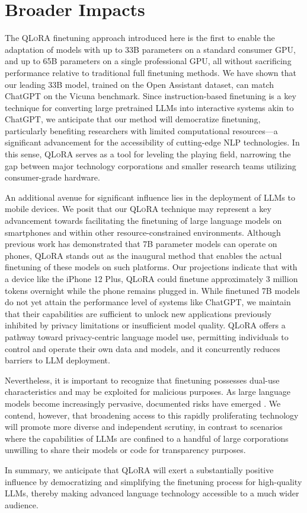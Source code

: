 \section{Broader Impacts}

The \textsc{QLoRA} finetuning approach introduced here is the first to enable the adaptation of models with up to 33B parameters on a standard consumer GPU, and up to 65B parameters on a single professional GPU, all without sacrificing performance relative to traditional full finetuning methods. We have shown that our leading 33B model, trained on the Open Assistant dataset, can match ChatGPT on the Vicuna benchmark. Since instruction-based finetuning is a key technique for converting large pretrained LLMs into interactive systems akin to ChatGPT, we anticipate that our method will democratize finetuning, particularly benefiting researchers with limited computational resources—a significant advancement for the accessibility of cutting-edge NLP technologies. In this sense, \textsc{QLoRA} serves as a tool for leveling the playing field, narrowing the gap between major technology corporations and smaller research teams utilizing consumer-grade hardware.

An additional avenue for significant influence lies in the deployment of LLMs to mobile devices. We posit that our \textsc{QLoRA} technique may represent a key advancement towards facilitating the finetuning of large language models on smartphones and within other resource-constrained environments. Although previous work has demonstrated that 7B parameter models can operate on phones, \textsc{QLoRA} stands out as the inaugural method that enables the actual finetuning of these models on such platforms. Our projections indicate that with a device like the iPhone 12 Plus, \textsc{QLoRA} could finetune approximately 3 million tokens overnight while the phone remains plugged in. While finetuned 7B models do not yet attain the performance level of systems like ChatGPT, we maintain that their capabilities are sufficient to unlock new applications previously inhibited by privacy limitations or insufficient model quality. \textsc{QLoRA} offers a pathway toward privacy-centric language model use, permitting individuals to control and operate their own data and models, and it concurrently reduces barriers to LLM deployment.

Nevertheless, it is important to recognize that finetuning possesses dual-use characteristics and may be exploited for malicious purposes. As large language models become increasingly pervasive, documented risks have emerged \citep{bommasani2021opportunities,bender2021dangers}. We contend, however, that broadening access to this rapidly proliferating technology will promote more diverse and independent scrutiny, in contrast to scenarios where the capabilities of LLMs are confined to a handful of large corporations unwilling to share their models or code for transparency purposes.

In summary, we anticipate that \textsc{QLoRA} will exert a substantially positive influence by democratizing and simplifying the finetuning process for high-quality LLMs, thereby making advanced language technology accessible to a much wider audience.